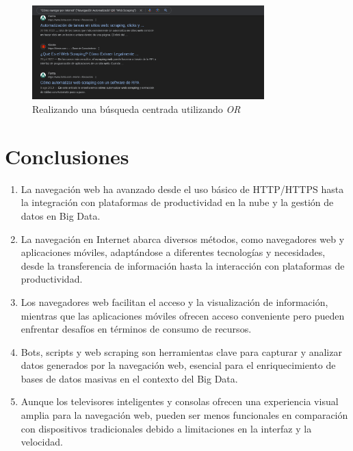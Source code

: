 \documentclass[12pt]{article}
\begin{document}
                \begin{figure}[h!]
                        \centering
                        \includegraphics[width=0.8\textwidth]{img/t1-7.png}
                        \caption{Realizando una búsqueda centrada utilizando \textit{OR}}
                \end{figure}
                

        \newpage
        \section{Conclusiones}
            \begin{enumerate}
                \item La navegación web ha avanzado desde el uso básico de HTTP/HTTPS hasta la integración con plataformas de productividad en la nube y la gestión de datos en Big Data.
                \item La navegación en Internet abarca diversos métodos, como navegadores web y aplicaciones móviles, adaptándose a diferentes tecnologías y necesidades, desde la transferencia de información hasta la interacción con plataformas de productividad.
                \item Los navegadores web facilitan el acceso y la visualización de información, mientras que las aplicaciones móviles ofrecen acceso conveniente pero pueden enfrentar desafíos en términos de consumo de recursos.
                \item Bots, scripts y web scraping son herramientas clave para capturar y analizar datos generados por la navegación web, esencial para el enriquecimiento de bases de datos masivas en el contexto del Big Data.
                \item Aunque los televisores inteligentes y consolas ofrecen una experiencia visual amplia para la navegación web, pueden ser menos funcionales en comparación con dispositivos tradicionales debido a limitaciones en la interfaz y la velocidad.
            \end{enumerate}
\end{document}
